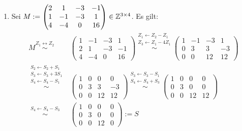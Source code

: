 \documentclass[../../main.tex]{subfiles}
\begin{document}
\begin{bsp}\label{17.1.4}
\begin{enumerate}[\normalfont(a)]
\item Sei $M:=\begin{pmatrix*}2 & 1 & -3 & -1\\ 1 & -1 & -3 & 1\\ 4 & -4 & 0 & 16\end{pmatrix*}\in \Z^{3\times 4}$. Es gilt:
\begin{align*}
M\stackrel{Z_1\leftrightarrow Z_2}{\sim}&\begin{pmatrix*}1 & -1 & -3 & 1\\ 2 & 1 & -3 & -1\\ 4 & -4 & 0 & 16\end{pmatrix*}\stackrel{\begin{smallmatrix*}Z_1\leftarrow Z_2-Z_1\\Z_3\leftarrow Z_1-4Z_1\end{smallmatrix*}}{\sim}\begin{pmatrix*}1 & -1 & -3 & 1\\ 0 &3 & 3 & -3\\ 0 & 0 & 12 & 12\end{pmatrix*}\\
\stackrel{\begin{smallmatrix*}S_2\leftarrow S_2+S_1\\S_3\leftarrow S_3+3S_1\\ S_4\leftarrow S_4-S_1\end{smallmatrix*}}{\sim}&\begin{pmatrix*}1 & 0 & 0 & 0\\ 0 &3 & 3 & -3\\ 0 & 0 & 12 & 12\end{pmatrix*}\stackrel{\begin{smallmatrix*}S_3\leftarrow S_3-S_1\\ S_4\leftarrow S_4+S_3\end{smallmatrix*}}{\sim}\begin{pmatrix*}1 & 0 & 0 & 0\\ 0 &3 & 0 & 0\\ 0 & 0 & 12 & 12\end{pmatrix*}\\
\stackrel{\begin{smallmatrix*}S_4\leftarrow S_4-S_3\end{smallmatrix*}}{\sim}&\begin{pmatrix*}1 & 0 & 0 & 0\\ 0 &3 & 0 & 0\\ 0 & 0 & 12 & 0\end{pmatrix*}:=S

\end{align*}
\end{enumerate}
\end{bsp}
\end{document}
